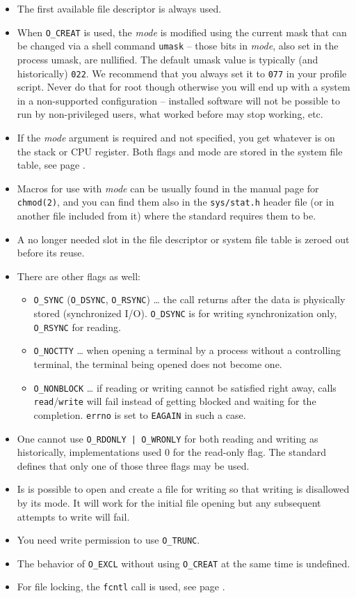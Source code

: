 \begin{itemize}
\item The first available file descriptor is always used.  
\item When \texttt{O\_CREAT} is used, the \emph{mode} is modified using the
current mask that can be changed via a shell command \texttt{umask} -- those
bits in \emph{mode}, also set in the process umask, are nullified.  The
default umask value is typically (and historically) \texttt{022}.  We recommend
that you always set it to \texttt{077} in your profile script.  Never do that for
root though otherwise you will end up with a system in a non-supported
configuration -- installed software will not be possible to run by
non-privileged users, what worked before may stop working, etc.
\item If the \emph{mode} argument is required and not specified, you get
whatever is on the stack or CPU register. Both flags and mode are stored in the
system file table, see page \pageref{OPENFILETABLES}.
\item Macros for use with \emph{mode} can be usually found in the manual page
for \texttt{chmod(2)}, and you can find them also in the \texttt{sys/stat.h}
header file (or in another file included from it) where the standard requires
them to be.
\item A no longer needed slot in the file descriptor or system file table is
zeroed out before its reuse.
\item There are other flags as well:
\begin{itemize}
\item \texttt{O\_SYNC} (\texttt{O\_DSYNC}, \texttt{O\_RSYNC}) \dots{} the call
returns after the data is physically stored (synchronized I/O).
\texttt{O\_DSYNC} is for writing synchronization only, \texttt{O\_RSYNC} for
reading.
\item \texttt{O\_NOCTTY} \dots{} when opening a terminal by a process without a
controlling terminal, the terminal being opened does not become one.
\item \label{O_NONBLOCK} \texttt{O\_NONBLOCK} \dots{} if reading or writing
cannot be satisfied right away, calls \texttt{read}/\texttt{write} will fail
instead of getting blocked and waiting for the completion.  \texttt{errno} is
set to \texttt{EAGAIN} in such a case.
\end{itemize}
\item One cannot use \texttt{O\_RDONLY | O\_WRONLY} for both reading and writing
as historically, implementations used 0 for the read-only flag.  The standard
defines that only one of those three flags may be used.
\item Is is possible to open and create a file for writing so that writing is
disallowed by its mode.  It will work for the initial file opening but any
subsequent attempts to write will fail.
\item You need write permission to use \texttt{O\_TRUNC}.
\item The behavior of \texttt{O\_EXCL} without using \texttt{O\_CREAT} at the
same time is undefined.
\item For file locking, the \texttt{fcntl} call is used, see page
\pageref{FCNTL}.
\end{itemize}


